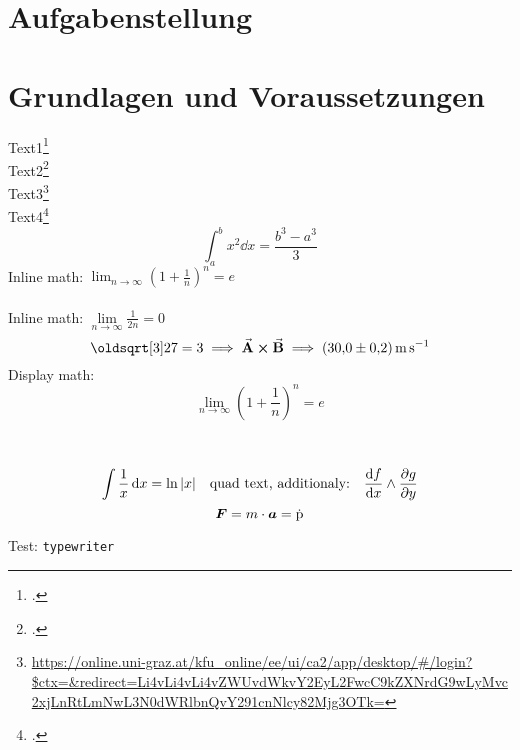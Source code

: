 \documentclass[ngerman]{scrartcl}
\begin{document}


\clearpage
\tableofcontents
\newpage

\section{Aufgabenstellung}
\label{sec:aufgabenstellung}



\section{Grundlagen und Voraussetzungen}
\label{sec:grundlagen_voraussetzungen}

Text1\footcite[1000]{ref:dem1} \\
Text2\footcite[Kapitel 74]{ref:knoll} \\
Text3\footnote{\url{https://online.uni-graz.at/kfu_online/ee/ui/ca2/app/desktop/\#/login?$ctx=&redirect=Li4vLi4vLi4vZWUvdWkvY2EyL2FwcC9kZXNrdG9wLyMvc2xjLnRtLmNwL3N0dWRlbnQvY291cnNlcy82Mjg3OTk=}} \\  %
Text4\footcite{ref:genol2013}
%
\begin{equation}
    \label{eq:grenzen-oben-unten}
    \int_a^b x^2 \dd{x} =\frac{b^3-a^3}{3}  %
\end{equation}
%
Inline math: \(\lim_{n \to \infty} \left( 1 + \frac{1}{n} \right) ^{n} = e\)  \\ \\ %
Inline math: $\lim \limits_{n \to \infty} \frac{1}{2n} = 0$  %
%
\begin{displaymath}
    \sqrt[3]{27} = 3 \implies \va{A} \cross \va{B} \implies \SI{30.0(2)}{\meter\per\second}
\end{displaymath}
%
Display math: \[\lim_{n \to \infty} \left( 1 + \frac{1}{n} \right) ^{n} = e\]  \\ \\ %
\[ \int \frac{1}{x} \dd{x} = \ln|x| \qq{quad text, additionaly:} \dv{f}{x} \land \pdv{g}{y}\]  %
$$ \vb*{F} = m \cdot \vb*{a} = \dot{\text{\textup{p}}}$$  %

Test: \texttt{typewriter}
\end{document}
